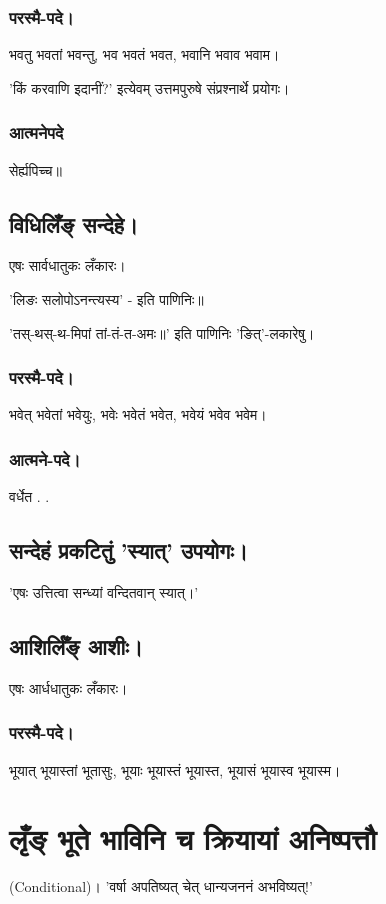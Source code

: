 \documentclass[oneside, article]{memoir}
\begin{document}
\subsubsection{परस्मै-पदे।}
भवतु भवतां भवन्तु, भव भवतं भवत, भवानि भवाव भवाम।

'किं करवाणि इदानीं?' इत्येवम् उत्तमपुरुषे संप्रश्नार्थे प्रयोगः।

\subsubsection{आत्मनेपदे}
सेर्ह्यपिच्च॥

\subsection{विधिलिँङ् सन्देहे।}
एषः सार्वधातुकः लँकारः।

'लिङः सलोपोऽनन्‍त्‍यस्‍य' - इति पाणिनिः॥

'तस्-थस्-थ-मिपां तां-तं-त-अमः॥' इति पाणिनिः 'ङित्'-लकारेषु। 


\subsubsection{परस्मै-पदे।}
भवेत् भवेतां भवेयुः, भवेः भवेतं भवेत, भवेयं भवेव भवेम।

\subsubsection{आत्मने-पदे।}
वर्धेत . .

\subsection{सन्देहं प्रकटितुं 'स्यात्' उपयोगः।}
'एषः उत्तित्वा सन्ध्यां वन्दितवान् स्यात्।'

\subsection{आशिर्लिँङ् आशीः।}
एषः आर्धधातुकः लँकारः।

\subsubsection{परस्मै-पदे।}
भूयात् भूयास्तां भूतासुः, भूयाः भूयास्तं भूयास्त, भूयासं भूयास्व भूयास्म।

\section{लृँङ् भूते भाविनि च क्रियायां अनिष्पत्तौ}
(Conditional)। 'वर्षा अपतिष्यत् चेत् धान्यजननं अभविष्यत्!'
\end{document}
